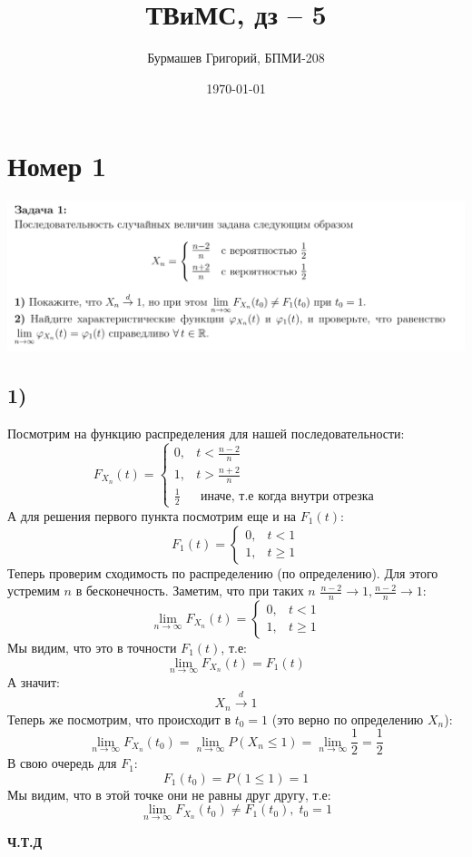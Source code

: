 \documentclass[a4paper,12pt]{article}
\author{Бурмашев Григорий, БПМИ-208}
\title{ТВиМС, дз -- 5}
\date{\today}
\begin{document}
\maketitle
\section*{Номер 1}
\begin{center}
\includegraphics[scale=0.4]{1.png}
\end{center}
\subsection*{1)}
Посмотрим на функцию распределения для нашей последовательности:
\[
F_{X_n} (t) = 
\begin{cases}
0, &t < \frac{n-2}{n} \\
1, &t > \frac{n + 2}{n} \\
\frac{1}{2} &\text{ иначе, т.е когда внутри отрезка}
\end{cases}
\]
А для решения первого пункта посмотрим еще и на $F_1(t)$:
\[
F_1(t) = 
\begin{cases}
0, &t < 1 \\
1, &t \geq 1
\end{cases}
\]
Теперь проверим сходимость по распределению (по определению). Для этого устремим $n$ в бесконечность. Заметим, что при таких $n$ $ \frac{n - 2}{n} \rightarrow 1, \frac{n - 2}{n} \rightarrow 1$:
\[
\lim_{n \rightarrow \infty} F_{X_n} (t) = 
\begin{cases}
0, &t < 1 \\
1, &t \geq 1
\end{cases}
\]
Мы видим, что это в точности $F_1(t)$, т.е:
\[
\lim_{n \rightarrow \infty} F_{X_n}(t) = F_1(t)
\]
А значит:
\[
X_n \overset{d}{\longrightarrow} 1
\]
Теперь же посмотрим, что происходит в $t_0 = 1$ (это верно по определению $X_n$):
\[
\lim_{n \rightarrow \infty} F_{X_n}(t_0) = \lim_{n \rightarrow \infty} P(X_n \leq 1) = \lim_{n \rightarrow \infty} \frac{1}{2} = \frac{1}{2}
\]
В свою очередь для $F_1$:
\[
F_1(t_0) = P(1 \leq 1) = 1
\]
Мы видим, что в этой точке они не равны друг другу, т.е:
\[
\lim_{n \rightarrow \infty} F_{X_n}(t_0) \neq F_1(t_0), \;  t_0 = 1
\]
\begin{center}
\textbf{Ч.Т.Д} 
\end{center}
\end{document}
